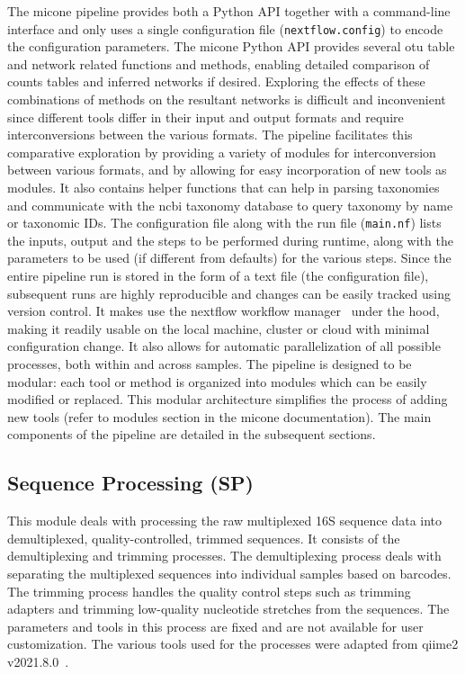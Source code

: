   The \ac{micone} pipeline provides both a Python API together with a command-line interface and only uses a single configuration file (\texttt{nextflow.config}) to encode the configuration parameters.
  The \ac{micone} Python API provides several \ac{otu} table and network related functions and methods, enabling detailed comparison of counts tables and inferred networks if desired.
  Exploring the effects of these combinations of methods on the resultant networks is difficult and inconvenient since different tools differ in their input and output formats and require interconversions between the various formats.
  The pipeline facilitates this comparative exploration by providing a variety of modules for interconversion between various formats, and by allowing for easy incorporation of new tools as modules.
  It also contains helper functions that can help in parsing taxonomies and communicate with the \ac{ncbi} taxonomy database to query taxonomy by name or taxonomic IDs.
  The configuration file along with the run file (\texttt{main.nf}) lists the inputs, output and the steps to be performed during runtime, along with the parameters to be used (if different from defaults) for the various steps.
  Since the entire pipeline run is stored in the form of a text file (the configuration file), subsequent runs are highly reproducible and changes can be easily tracked using version control.
  It makes use the nextflow workflow manager~\cite{Tommaso2015} under the hood, making it readily usable on the local machine, cluster or cloud with minimal configuration change.
  It also allows for automatic parallelization of all possible processes, both within and across samples.
  The pipeline is designed to be modular: each tool or method is organized into modules which can be easily modified or replaced.
  This modular architecture simplifies the process of adding new tools (refer to modules section in the \ac{micone} documentation).
  The main components of the pipeline are detailed in the subsequent sections.

  \subsection*{Sequence Processing (SP)}
  \vspace{-5mm}
  This module deals with processing the raw multiplexed 16S sequence data into demultiplexed, quality-controlled, trimmed sequences.
  It consists of the demultiplexing and trimming processes.
  The demultiplexing process deals with separating the multiplexed sequences into individual samples based on barcodes.
  The trimming process handles the quality control steps such as trimming adapters and trimming low-quality nucleotide stretches from the sequences.
  The parameters and tools in this process are fixed and are not available for user customization.
  The various tools used for the processes were adapted from \ac{qiime2} v2021.8.0~\cite{bolyenReproducibleInteractiveScalable2019}.

